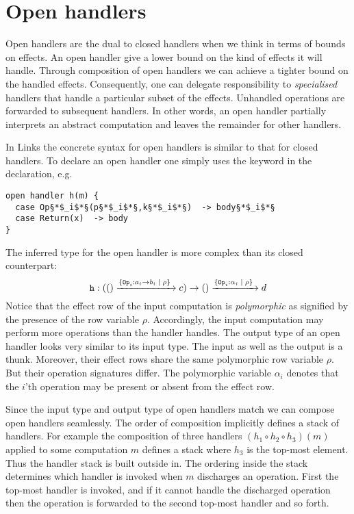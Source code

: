 \section{Open handlers}
Open handlers are the dual to closed handlers when we think in terms of bounds on effects. An open handler give a lower bound on the kind of effects it will handle. Through composition of open handlers we can achieve a tighter bound on the handled effects. Consequently, one can delegate responsibility to \emph{specialised} handlers that handle a particular subset of the effects. Unhandled operations are forwarded to subsequent handlers. In other words, an open handler partially interprets an abstract computation and leaves the remainder for other handlers.

In Links the concrete syntax for open handlers is similar to that for closed handlers. To declare an open handler one simply uses the keyword  in the declaration, e.g.
\begin{lstlisting}[style=links]
open handler h(m) {
  case Op§*$_i$*§(p§*$_i$*§,k§*$_i$*§)  -> body§*$_i$*§
  case Return(x)  -> body
}
\end{lstlisting}
The inferred type for the open handler  is more complex than its closed counterpart:
\[ \texttt{h} : (() \xrightarrow{ \{ \texttt{Op}_i: a_i \to b_i \; | \; \rho\}\; } c) \to () \xrightarrow{ \{ \texttt{Op}_i: \alpha_i \; | \; \rho\}\;} d\]
Notice that the effect row of the input computation is \emph{polymorphic} as signified by the presence of the row variable $\rho$. Accordingly, the input computation may perform more operations than the handler handles. The output type of an open handler looks very similar to its input type. The input as well as the output is a thunk. Moreover, their effect rows share the same polymorphic row variable $\rho$. But their operation signatures differ. The polymorphic variable $\alpha_i$ denotes that the $i$'th operation may be present or absent from the effect row.

Since the input type and output type of open handlers match we can compose open handlers seamlessly. The order of composition implicitly defines a stack of handlers. For example the composition of three handlers $(h_1 \circ h_2 \circ h_3)(m)$ applied to some computation $m$ defines a stack where $h_3$ is the top-most element. Thus the handler stack is built outside in. The ordering inside the stack determines which handler is invoked when $m$ discharges an operation. First the top-most handler is invoked, and if it cannot handle the discharged operation then the operation is forwarded to the second top-most handler and so forth.

